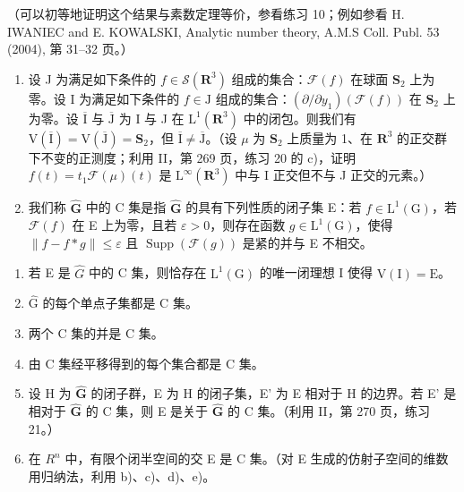 （可以初等地证明这个结果与素数定理等价，参看练习 10；例如参看 H. IWANIEC and E. KOWALSKI, Analytic number theory, A.M.S Coll. Publ. 53 (2004), 第 31--32 页。）

\begin{enumerate}
\def\labelenumi{\arabic{enumi})}
\setcounter{enumi}{11}
\item
  设 J 为满足如下条件的 \(f \in \mathcal{S}(\mathbf{R}^3)\) 组成的集合：\(\mathcal{F}(f)\) 在球面 \(\mathbf{S}_2\) 上为零。设 I 为满足如下条件的 \(f \in \mathrm{J}\) 组成的集合：\((\partial/\partial y_1)(\mathcal{F}(f))\) 在 \(\mathbf{S}_2\) 上为零。设 \(\overline{\mathrm{I}}\) 与 \(\overline{\mathrm{J}}\) 为 I 与 J 在 \(\mathrm{L}^1(\mathbf{R}^3)\) 中的闭包。则我们有 \(\mathrm{V}(\overline{\mathrm{I}}) = \mathrm{V}(\overline{\mathrm{J}}) = \mathbf{S}_2\)，但 \(\overline{\mathrm{I}} \neq \overline{\mathrm{J}}\)。（设 \(\mu\) 为 \(\mathbf{S}_2\) 上质量为 1、在 \(\mathbf{R}^3\) 的正交群下不变的正测度；利用 II，第 269 页，练习 20 的 c)，证明 \(f(t) = t_1\mathcal{F}(\mu)(t)\) 是 \(\mathrm{L}^\infty(\mathbf{R}^3)\) 中与 I 正交但不与 J 正交的元素。）
\item
  我们称 \(\widehat{\mathbf{G}}\) 中的 C 集是指 \(\widehat{\mathbf{G}}\) 的具有下列性质的闭子集 E：若 \(f\in \mathrm{L}^{1}(\mathrm{G})\)，若 \(\mathcal{F}(f)\) 在 E 上为零，且若 \(\varepsilon >0\)，则存在函数 \(g\in \mathrm{L}^{1}(\mathrm{G})\)，使得 \(\| f - f*g\| \leqslant \varepsilon\) 且 \(\operatorname {Supp}(\mathcal{F}(g))\) 是紧的并与 E 不相交。
\end{enumerate}

\begin{enumerate}
\def\labelenumi{\alph{enumi})}
\item
  若 E 是 \(\widehat{G}\) 中的 C 集，则恰存在 \(\mathrm{L}^1 (\mathrm{G})\) 的唯一闭理想 I 使得 \(\mathrm{V(I)} = \mathrm{E}\)。
\item
  \(\widehat{\mathrm{G}}\) 的每个单点子集都是 C 集。
\item
  两个 C 集的并是 C 集。
\item
  由 C 集经平移得到的每个集合都是 C 集。
\item
  设 H 为 \(\widehat{\mathbf{G}}\) 的闭子群，E 为 H 的闭子集，E' 为 E 相对于 H 的边界。若 E' 是相对于 \(\widehat{\mathbf{G}}\) 的 C 集，则 E 是关于 \(\widehat{\mathbf{G}}\) 的 C 集。（利用 II，第 270 页，练习 21。）
\item
  在 \(R^{n}\) 中，有限个闭半空间的交 E 是 C 集。（对 E 生成的仿射子空间的维数用归纳法，利用 b)、c)、d)、e)。
\end{enumerate}

